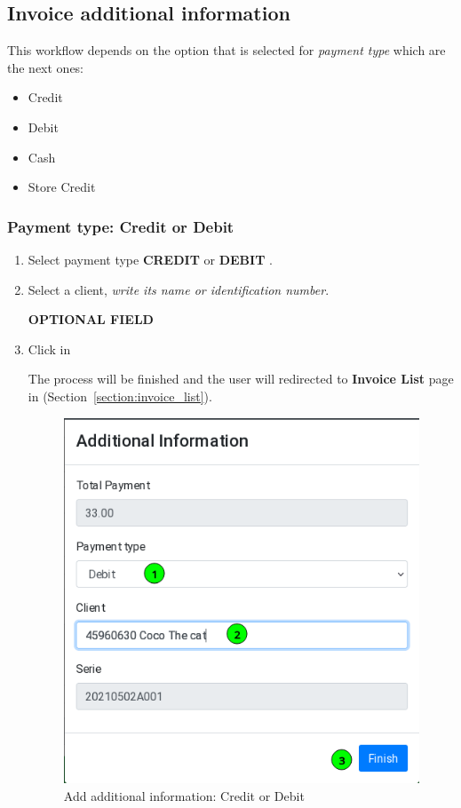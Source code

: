 \documentclass[a4paper,11pt]{refart}
\begin{document}
\subsection{Invoice additional information}\label{section:invoice_additional_information}
This workflow depends on the option that is selected for \emph{payment type} which are the next ones:
\begin{itemize}
	\item Credit
	\item Debit
	\item Cash
	\item Store Credit
\end{itemize}
\subsubsection{Payment type: Credit or Debit}
\begin{enumerate}
	\item Select payment type \textbf{CREDIT} or \textbf{DEBIT}	.
	\item Select a client, \emph{write its name or identification number}.
	\medskip
	\begin{leftbar}
		\textbf{OPTIONAL FIELD}
	\end{leftbar}
	\item Click in  	
	\medskip
	\begin{leftbar}
		The process will be finished and the user will redirected to \textbf{Invoice List} page in (Section~\ref{section:invoice_list}).
	\end{leftbar}
	\begin{figure}[H]\centering
		\includegraphics[width=\textwidth]{images/sellinvoice-5}
		\caption{Add additional information: Credit or Debit}\label{fig:sellinvoice-5}
	\end{figure}
\end{enumerate}
\end{document}
